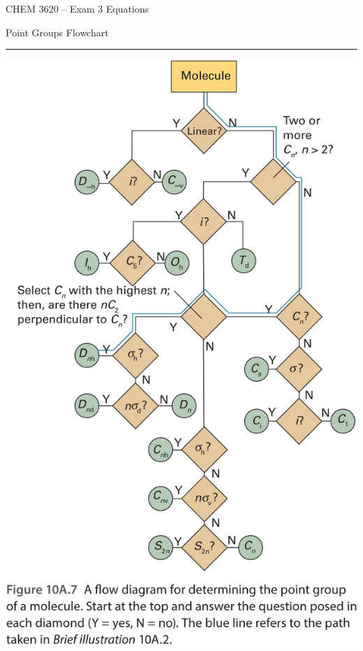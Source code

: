 \documentclass[12pt, letterpaper]{memoir}
\begin{document}
	\mainmatter
	
	\begin{center}
		{\Huge CHEM 3620}
		{\LARGE-- Exam 3 Equations}
	
		
		\begin{center}		
			\begin{minipage}[c]{0.7\textwidth}
				\begin{mdframed}
					\centering
					Point Groups Flowchart
					\hrule
					\includegraphics[width = \textwidth]{Point_Groups_Flowchart}
				\end{mdframed}
			\end{minipage}
		\end{center}				
	\end{center}
\end{document}
